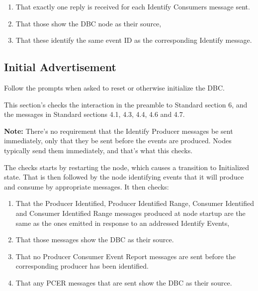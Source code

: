 \begin{enumerate}
\item That exactly one reply is received for each Identify Consumers message sent.
\item That those show the DBC node as their source,
\item That these identify the same event ID as the corresponding Identify message.
\end{enumerate}

\subsection{Initial Advertisement}

Follow the prompts when asked to reset or otherwise initialize the DBC.

This section's checks the interaction in the preamble to Standard section 6, and
the messages in Standard sections 4.1, 4.3, 4.4, 4.6 and 4.7.

\textbf{Note:}  There's no requirement that the Identify Producer messages
be sent immediately, only that they be sent before the events are produced.
Nodes typically send them immediately, and that's what this checks.

The checks starts by restarting the node, which causes a transition to Initialized
state.  That is then followed by the node identifying events that it will 
produce and consume by appropriate messages. It then checks:

\begin{enumerate}
\item That the Producer Identified, Producer Identified Range, Consumer Identified 
    and Consumer Identified Range messages produced at node startup are the same
    as the ones emitted in response to an addressed Identify Events,
\item That those messages show the DBC as their source.
\item That no Producer Consumer Event Report messages are sent before the 
    corresponding producer has been identified.
\item That any PCER messages that are sent show the DBC as their source.
\end{enumerate}

  
